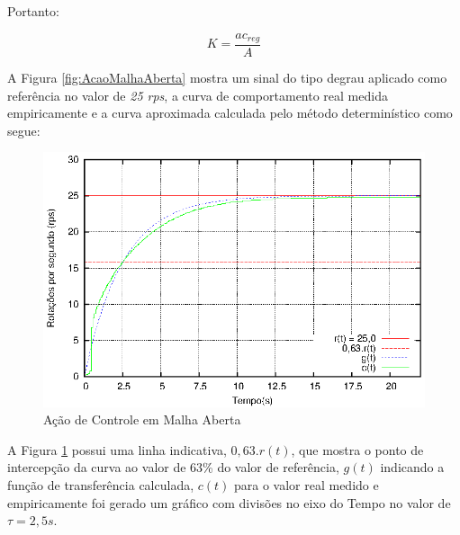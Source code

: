 Portanto:

\begin{equation}
K = \frac{ac_{reg}}{A}
\label{eq:calcK}
\end{equation}








A Figura \ref{fig:AcaoMalhaAberta} mostra um sinal do tipo degrau aplicado como referência no valor de \emph{25 rps}, a curva de comportamento real medida empiricamente e a curva aproximada calculada pelo método determinístico como segue:

\begin{figure}[!htb]
\center\includegraphics[scale=1.4]{./imagens/acaoMalhaAbertaTau.eps}
\caption{Ação de Controle em Malha Aberta}
\label{fig:acaoMalhaAberTau}
\end{figure}

A Figura \ref{fig:acaoMalhaAberTau} possui uma linha indicativa, $0,63.r(t)$, que mostra o ponto de intercepção da curva ao valor de 63\% do valor de referência, $g(t)$ indicando a função de transferência calculada, $c(t)$ para o valor real medido e empiricamente foi gerado um gráfico com divisões no eixo do Tempo no valor de $\tau = 2,5 s $.




